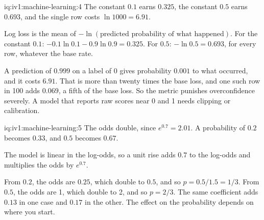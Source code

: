 \begin{solution}{iq:iv1:machine-learning:4}
The constant $0.1$ earns $0.325$, the constant $0.5$ earns $0.693$, and the single row costs $\ln 1000 = 6.91$.

Log loss is the mean of $-\ln(\text{predicted probability of what happened})$. For the constant $0.1$: $-0.1\ln 0.1 - 0.9\ln 0.9 = 0.325$. For $0.5$: $-\ln 0.5 = 0.693$, for every row, whatever the base rate.

A prediction of $0.999$ on a label of 0 gives probability $0.001$ to what occurred, and it costs $6.91$. That is more than twenty times the base loss, and one such row in 100 adds $0.069$, a fifth of the base loss. So the metric punishes overconfidence severely. A model that reports raw scores near 0 and 1 needs clipping or calibration.



\end{solution}

\begin{solution}{iq:iv1:machine-learning:5}
The odds double, since $e^{0.7} = 2.01$. A probability of $0.2$ becomes $0.33$, and $0.5$ becomes $0.67$.

The model is linear in the log-odds, so a unit rise adds $0.7$ to the log-odds and multiplies the odds by $e^{0.7}$.

From $0.2$, the odds are $0.25$, which double to $0.5$, and so $p = 0.5/1.5 = 1/3$. From $0.5$, the odds are 1, which double to 2, and so $p = 2/3$. The same coefficient adds $0.13$ in one case and $0.17$ in the other. The effect on the probability depends on where you start.



\end{solution}

